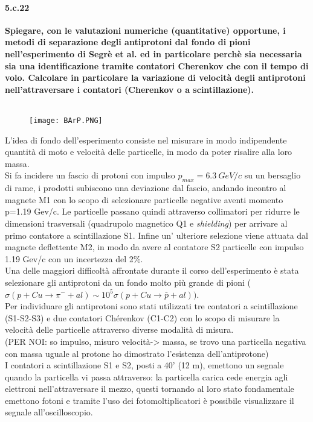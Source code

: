 \documentclass[twoside]{article}
\begin{document}
\paragraph{5.c.22}\textbf{Spiegare, con le valutazioni numeriche (quantitative) opportune, i metodi di separazione degli antiprotoni dal fondo di pioni nell’esperimento di Segrè et al. ed in particolare perchè sia necessaria sia una identificazione tramite contatori Cherenkov che con il tempo di volo. Calcolare in particolare la variazione di velocità degli antiprotoni nell'attraversare i contatori (Cherenkov o a scintillazione).}\\
\\
\begin{figure}[H]
    \centering
    \texttt{[image: BArP.PNG]}
    \label{fig:BarP}
\end{figure}
L'idea di fondo dell'esperimento consiste nel misurare in modo indipendente quantità di moto e velocità delle particelle, in modo da poter risalire alla loro massa.\\
Si fa incidere un fascio di protoni con impulso $p_{max}=6.3\ GeV/c$ su un bersaglio di rame, i prodotti subiscono una deviazione dal fascio, andando incontro al magnete M1 con lo scopo di selezionare particelle negative aventi momento p=1.19 Gev/c. Le particelle passano quindi attraverso collimatori per ridurre le dimensioni trasversali (quadrupolo magnetico Q1 e \textit{shielding}) per arrivare al primo contatore a scintillazione S1. Infine un' ulteriore selezione viene attuata dal magnete deflettente M2, in modo da avere al contatore S2 particelle con impulso 1.19 Gev/c con un incertezza del 2$\%$.\\
Una delle maggiori difficoltà affrontate durante il corso dell'esperimento è stata selezionare gli antiprotoni da un fondo molto più grande di pioni ($\sigma(p+Cu\to\pi^{-}+al)\sim 10^5\sigma(p+Cu\to\bar{p}+al))$.\\
Per individuare gli antiprotoni sono stati utilizzati tre contatori a scintillazione (S1-S2-S3) e due contatori Chérenkov (C1-C2) con lo scopo di misurare la velocità delle particelle attraverso diverse modalità di misura.\\
(PER NOI: so impulso, misuro velocità-> massa, se trovo una particella negativa con massa uguale al protone ho dimostrato l'esistenza dell'antiprotone)\\
I contatori a scintillazione S1 e S2, posti a 40' (12 m), emettono un segnale quando la particella vi passa attraverso: la particella carica cede energia agli elettroni nell'attraversare il mezzo, questi tornando al loro stato fondamentale emettono fotoni e tramite l'uso dei fotomoltiplicatori è possibile visualizzare il segnale all'oscilloscopio.\\
\end{document}
